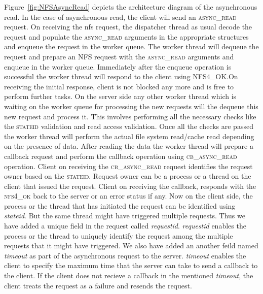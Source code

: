 Figure~\ref{fig:NFSAsyncRead} depicts the architecture diagram of the asynchronous read. 
In the case of asynchronous read, the client will send an \textsc{async\_read} request. On receiving the nfs request, the dispatcher thread as usual decode the request and populate the \textsc{async\_read} arguments in the appropriate structures and enqueue the request in the worker queue. The worker thread will dequeue the request and prepare an NFS request with the \textsc{async\_read} arguments and enqueue in the worker queue. Immediately after the enqueue operation is successful the worker thread will respond to the client using \textsc{NFS4\_OK}.On receiving the initial response, client is not blocked any more and is free to perform further tasks. On the server side any other worker thread which is waiting on the worker queue for processing the new requests will the dequeue this new request and process it. This involves performing all the necessary checks like the \textsc{stateid} validation and read access validation. Once all the checks are passed the worker thread will perform the actual file system read/cache read depending on the presence of data. After reading the data the worker thread will prepare a callback request and perform the callback operation using \textsc{cb\_async\_read} operation. Client on receiving the \textsc{cb\_async\_read} request identifies the request owner based on the \textsc{stateid}. Request owner can  be a process or a thread on the client that issued the request. Client on receiving the callback, responds with the \textsc{nfs4\_ok} back to the server or an error status if any. Now on the client side, the process or the thread that has initiated the request can be identified using \textit{stateid}. But the same thread might have triggered multiple requests. Thus we have added a unique field in the request called \textit{requestid}.  \textit{requestid} enables the process or the thread to uniquely identify the request among the multiple requests that it might have triggered. We also have added an another feild named  \textit{timeout} as part of  the asynchronous request to the server. \textit{timeout} enables the client to specify the maximum time that the server can take to send a callback to the client. If the client does not recieve a callback in the mentioned  \textit{timeout}, the client treats the request as a failure and resends the request.





